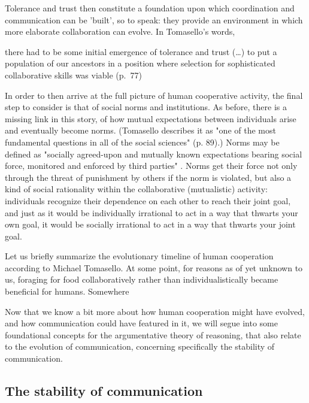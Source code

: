 Tolerance and trust then constitute a foundation upon which coordination and communication can be 'built', so to speak: they provide an environment in which more elaborate collaboration can evolve. In Tomasello's words,
\begin{quoting}
    there had to be some initial emergence of tolerance and trust (\ldots) to put a population of our ancestors in a position where selection for sophisticated collaborative skills was viable
    \hfill (p.~77)
\end{quoting}

In order to then arrive at the full picture of human cooperative activity, the final step to consider is that of social norms and institutions. As before, there is a missing link in this story, of how mutual expectations between individuals arise and eventually become norms. (Tomasello describes it as "one of the most fundamental questions in all of the social sciences" (p. 89).)
Norms may be defined as "socially agreed-upon and mutually known expectations bearing social force, monitored and enforced by third parties" \citep[p.~87]{Tomasello09}. Norms get their force not only through the threat of punishment by others if the norm is violated, but also a kind of social rationality within the collaborative (mutualistic) activity: individuals recognize their dependence on each other to reach their joint goal, and just as it would be individually irrational to act in a way that thwarts your own goal, it would be socially irrational to act in a way that thwarts your joint goal.

Let us briefly summarize the evolutionary timeline of human cooperation according to Michael Tomasello.
At some point, for reasons as of yet unknown to us, foraging for food collaboratively rather than individualistically became beneficial for humans. Somewhere 

Now that we know a bit more about how human cooperation might have evolved, and how communication could have featured in it, we will segue into some foundational concepts for the argumentative theory of reasoning, that also relate to the evolution of communication, concerning specifically the stability of communication.

\subsection{The stability of communication}


